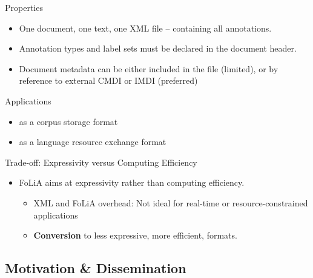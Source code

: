 \documentclass[compress,10pt]{beamer}
\begin{document}
\begin{frame}

	\begin{block}{Properties}
		\begin{itemize}	
			\item One document, one text, one XML file -- containing all annotations.
			\item Annotation types and label sets must be declared in the document header.
			\item Document metadata can be either included in the file (limited), or by reference to external CMDI or IMDI (preferred)
		\end{itemize}
	\end{block}

	\begin{block}{Applications}
		\begin{itemize}
			\item as a corpus storage format
			\item as a language resource exchange format 
		\end{itemize}				
	\end{block}
	
	\begin{block}{Trade-off: Expressivity versus Computing Efficiency}		
		\begin{itemize}
			\item FoLiA aims at expressivity rather than computing efficiency. 
			\begin{itemize}
				\item XML and FoLiA overhead: Not ideal for real-time or resource-constrained applications
				\item \textbf{Conversion} to less expressive, more efficient, formats.
			\end{itemize}			 
		\end{itemize}	
	\end{block}
	
\end{frame}	
	
\subsection{Motivation \& Dissemination}	
	
\end{document}
